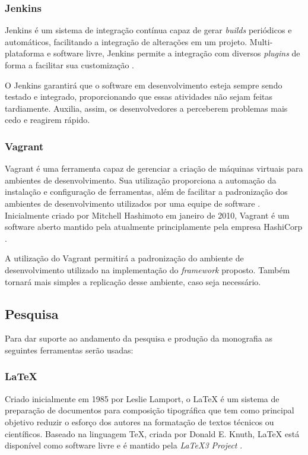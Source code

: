 \subsubsection{Jenkins}
Jenkins é um sistema de integração contínua capaz de gerar \textit{builds} periódicos e automáticos, facilitando a integração de alterações em um projeto. Multi-plataforma e software livre, Jenkins permite a integração com diversos \textit{plugins} de forma a facilitar sua customização \cite{jenkins2015}.
\par
\indent O Jenkins garantirá que o software em desenvolvimento esteja sempre sendo testado e integrado, proporcionando que essas atividades não sejam feitas tardiamente. Auxilia, assim, os desenvolvedores a perceberem problemas mais cedo e reagirem rápido.

\subsubsection{Vagrant}
Vagrant é uma ferramenta capaz de gerenciar a criação de máquinas virtuais para ambientes de desenvolvimento. Sua utilização proporciona a automação da instalação e configuração de ferramentas, além de facilitar a padronização dos ambientes de desenvolvimento utilizados por uma equipe de software \cite{vagrant2015}. Inicialmente criado por Mitchell Hashimoto em janeiro de 2010, Vagrant é um software aberto mantido pela atualmente principlamente pela empresa HashiCorp \cite{vagrant2015}. 

A utilização do Vagrant permitirá a padronização do ambiente de desenvolvimento utilizado na implementação do \textit{framework} proposto. Também tornará mais simples a replicação desse ambiente, caso seja necessário.

\subsection{Pesquisa}
Para dar suporte ao andamento da pesquisa e produção da monografia as seguintes ferramentas serão usadas:

\subsubsection{LaTeX}
Criado inicialmente em 1985 por Leslie Lamport, o LaTeX é um sistema de preparação de documentos para composição tipográfica que tem como principal objetivo reduzir o esforço dos autores na formatação de textos técnicos ou científicos. Baseado na linguagem TeX, criada por Donald E. Knuth, LaTeX está disponível como software livre e é mantido pela \textit{LaTeX3 Project} \cite{latex2015}.

